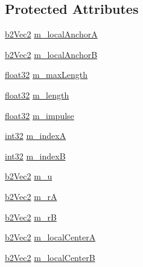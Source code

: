 \subsection*{Protected Attributes}
\begin{DoxyCompactItemize}
\item 
\mbox{\hyperlink{structb2_vec2}{b2\+Vec2}} \mbox{\hyperlink{classb2_rope_joint_a43640240dc39c912ea1cc6e1ae9fa614}{m\+\_\+local\+AnchorA}}
\item 
\mbox{\hyperlink{structb2_vec2}{b2\+Vec2}} \mbox{\hyperlink{classb2_rope_joint_a57dfab74bae88c2c3284ed640825c959}{m\+\_\+local\+AnchorB}}
\item 
\mbox{\hyperlink{b2_settings_8h_aacdc525d6f7bddb3ae95d5c311bd06a1}{float32}} \mbox{\hyperlink{classb2_rope_joint_ace7528ca1183f34cfc79e47f46b29130}{m\+\_\+max\+Length}}
\item 
\mbox{\hyperlink{b2_settings_8h_aacdc525d6f7bddb3ae95d5c311bd06a1}{float32}} \mbox{\hyperlink{classb2_rope_joint_a2cee8c35d881b0ae66d28d13c6d8d66a}{m\+\_\+length}}
\item 
\mbox{\hyperlink{b2_settings_8h_aacdc525d6f7bddb3ae95d5c311bd06a1}{float32}} \mbox{\hyperlink{classb2_rope_joint_ac19ae74b5f3c104bc763e99b3986afd6}{m\+\_\+impulse}}
\item 
\mbox{\hyperlink{b2_settings_8h_a43d43196463bde49cb067f5c20ab8481}{int32}} \mbox{\hyperlink{classb2_rope_joint_a34875f5852d011dab695613a23adca08}{m\+\_\+indexA}}
\item 
\mbox{\hyperlink{b2_settings_8h_a43d43196463bde49cb067f5c20ab8481}{int32}} \mbox{\hyperlink{classb2_rope_joint_aa67100c069a1a273314dfa55c9063fc7}{m\+\_\+indexB}}
\item 
\mbox{\hyperlink{structb2_vec2}{b2\+Vec2}} \mbox{\hyperlink{classb2_rope_joint_ae95185c5ad4c119a9893294491ba1609}{m\+\_\+u}}
\item 
\mbox{\hyperlink{structb2_vec2}{b2\+Vec2}} \mbox{\hyperlink{classb2_rope_joint_af8ae48af2656b1e605a099b8f4aa82b0}{m\+\_\+rA}}
\item 
\mbox{\hyperlink{structb2_vec2}{b2\+Vec2}} \mbox{\hyperlink{classb2_rope_joint_ae577e49beef03d266ff4c54e852b4f41}{m\+\_\+rB}}
\item 
\mbox{\hyperlink{structb2_vec2}{b2\+Vec2}} \mbox{\hyperlink{classb2_rope_joint_a15ff1472deb6405c9886a40ee99efcef}{m\+\_\+local\+CenterA}}
\item 
\mbox{\hyperlink{structb2_vec2}{b2\+Vec2}} \mbox{\hyperlink{classb2_rope_joint_a2b3b1ac9ae9e3e68b2550809ec178877}{m\+\_\+local\+CenterB}}
\item 

\end{DoxyCompactItemize}
